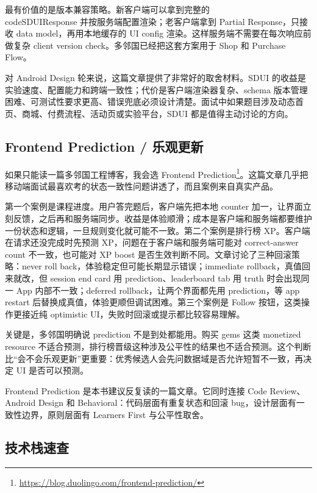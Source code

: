 最有价值的是版本兼容策略。新客户端可以拿到完整的 \\code{SDUIResponse} 并按服务端配置渲染；老客户端拿到 Partial Response，只接收 data model，再用本地缓存的 UI config 渲染。这样服务端不需要在每次响应前做复杂 client version check。多邻国已经把这套方案用于 Shop 和 Purchase Flow。

对 Android Design 轮来说，这篇文章提供了非常好的取舍材料。SDUI 的收益是实验速度、配置能力和跨端一致性；代价是客户端渲染器复杂、schema 版本管理困难、可测试性要求更高、错误兜底必须设计清楚。面试中如果题目涉及动态首页、商城、付费流程、活动页或实验平台，SDUI 都是值得主动讨论的方向。

\subsection{Frontend Prediction / 乐观更新}

\srcofficial 如果只能读一篇多邻国工程博客，我会选 Frontend Prediction\footnote{\url{https://blog.duolingo.com/frontend-prediction/}}。这篇文章几乎把移动端面试最喜欢考的状态一致性问题讲透了，而且案例来自真实产品。

第一个案例是课程进度。用户答完题后，客户端先把本地 counter 加一，让界面立刻反馈，之后再和服务端同步。收益是体验顺滑；成本是客户端和服务端都要维护一份状态和逻辑，一旦规则变化就可能不一致。第二个案例是排行榜 XP。客户端在请求还没完成时先预测 XP，问题在于客户端和服务端可能对 correct-answer count 不一致，也可能对 XP boost 是否生效判断不同。文章讨论了三种回滚策略：never roll back，体验稳定但可能长期显示错误；immediate rollback，真值回来就改，但 session end card 用 prediction、leaderboard tab 用 truth 时会出现同一 App 内部不一致；deferred rollback，让两个界面都先用 prediction，等 app restart 后替换成真值，体验更顺但调试困难。第三个案例是 Follow 按钮，这类操作更接近纯 optimistic UI，失败时回滚或提示都比较容易理解。

关键是，多邻国明确说 prediction 不是到处都能用。购买 gems 这类 monetized resource 不适合预测，排行榜晋级这种涉及公平性的结果也不适合预测。这个判断比“会不会乐观更新”更重要：优秀候选人会先问数据域是否允许短暂不一致，再决定 UI 是否可以预测。

\begin{idea}[最高收益官方读物]
Frontend Prediction 是本书建议反复读的一篇文章。它同时连接 Code Review、Android Design 和 Behavioral：代码层面有重复状态和回滚 bug，设计层面有一致性边界，原则层面有 Learners First 与公平性取舍。
\end{idea}

\subsection{技术栈速查}


